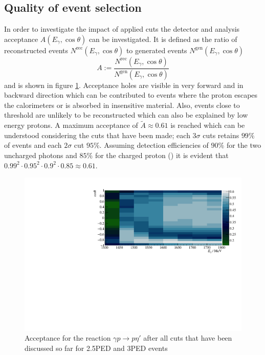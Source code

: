 \subsection{Quality of event selection}
In order to investigate the impact of applied cuts the detector and analysis acceptance $A(E_\gamma,\cos\theta)$ can be investigated. It is defined as the ratio of reconstructed events $N^\text{rec}(E_\gamma,\cos\theta)$ to generated events $N^\text{gen}(E_\gamma,\cos\theta)$ \begin{equation}
	A:=\frac{N^\text{rec}(E_\gamma,\cos\theta)}{N^\text{gen}(E_\gamma,\cos\theta)}
\end{equation}
and is shown in figure \ref{fig:acc}. Acceptance holes are visible in very forward and in backward direction which can be contributed to events where the proton escapes the calorimeters or is absorbed in insensitive material. Also, events close to threshold are unlikely to be reconstructed which can also be explained by low energy protons. A maximum acceptance of $\tilde{A}\approx0.61$ is reached which can be understood considering the cuts that have been made; each $3\sigma$ cuts retains $99\%$ of events and each $2\sigma$ cut $95\%$. Assuming detection efficiencies of $90\%$ for the two uncharged photons and $85\%$ for the charged proton (\cite{farahphd,hartmannphd}) it is evident that $0.99^2\cdot0.95^2\cdot0.9^2\cdot0.85\approx0.61$.
\begin{figure}[htbp]
	\centering
	\includegraphics[width=\linewidth]{../figs/hydrogen/acceptance.pdf}
	\caption{Acceptance for the reaction $\gamma p\to p \eta'$ after all cuts that have been discussed so far for 2.5PED and 3PED events}
	\label{fig:acc}
\end{figure}
